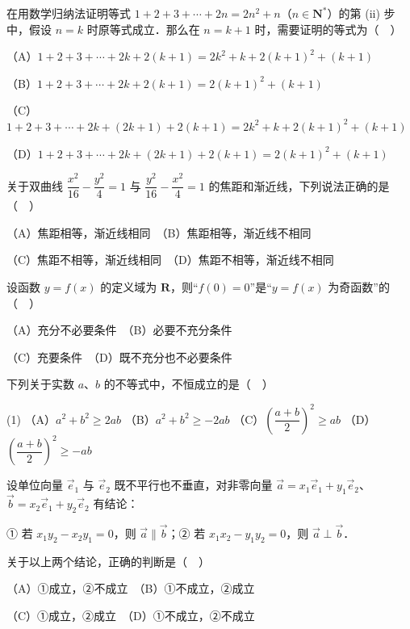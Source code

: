 \begin{question}
在用数学归纳法证明等式 \(1+2+3+\cdots+2n=2n^{2}+n\)（\(n\in\mathbf{N}^{*}\)）的第 (ii) 步中，假设 \(n=k\) 时原等式成立．那么在 \(n=k+1\) 时，需要证明的等式为（　）

（A）\(1+2+3+\cdots+2k+2(k+1)=2k^{2}+k+2(k+1)^{2}+(k+1)\)

（B）\(1+2+3+\cdots+2k+2(k+1)=2(k+1)^{2}+(k+1)\)

（C）\(1+2+3+\cdots+2k+(2k+1)+2(k+1)=2k^{2}+k+2(k+1)^{2}+(k+1)\)

（D）\(1+2+3+\cdots+2k+(2k+1)+2(k+1)=2(k+1)^{2}+(k+1)\)

\end{question}
\begin{question}
关于双曲线 \(\dfrac{x^{2}}{16}-\dfrac{y^{2}}{4}=1\) 与 \(\dfrac{y^{2}}{16}-\dfrac{x^{2}}{4}=1\) 的焦距和渐近线，下列说法正确的是（　）

（A）焦距相等，渐近线相同　（B）焦距相等，渐近线不相同

（C）焦距不相等，渐近线相同　（D）焦距不相等，渐近线不相同

\end{question}
\begin{question}
设函数 \(y=f(x)\) 的定义域为 \(\mathbf{R}\)，则“\(f(0)=0\)”是“\(y=f(x)\) 为奇函数”的（　）

（A）充分不必要条件　（B）必要不充分条件

（C）充要条件　（D）既不充分也不必要条件

\end{question}
\begin{question}
下列关于实数 \(a\)、\(b\) 的不等式中，不恒成立的是（　）

\begin{gkopts}(1)
\task （A）\(a^{2}+b^{2}\geqslant 2ab\)
\task （B）\(a^{2}+b^{2}\geqslant -2ab\)
\task （C）\(\left(\dfrac{a+b}{2}\right)^{2}\geqslant ab\)
\task （D）\(\left(\dfrac{a+b}{2}\right)^{2}\geqslant -ab\)
\end{gkopts}

\end{question}
\begin{question}
设单位向量 \(\vec{e}_{1}\) 与 \(\vec{e}_{2}\) 既不平行也不垂直，对非零向量 \(\vec{a}=x_{1}\vec{e}_{1}+y_{1}\vec{e}_{2}\)、\(\vec{b}=x_{2}\vec{e}_{1}+y_{2}\vec{e}_{2}\) 有结论：

① 若 \(x_{1}y_{2}-x_{2}y_{1}=0\)，则 \(\vec{a}\parallel\vec{b}\)；② 若 \(x_{1}x_{2}-y_{1}y_{2}=0\)，则 \(\vec{a}\perp\vec{b}\)．

关于以上两个结论，正确的判断是（　）

（A）①成立，②不成立　（B）①不成立，②成立

（C）①成立，②成立　（D）①不成立，②不成立

\end{question}
